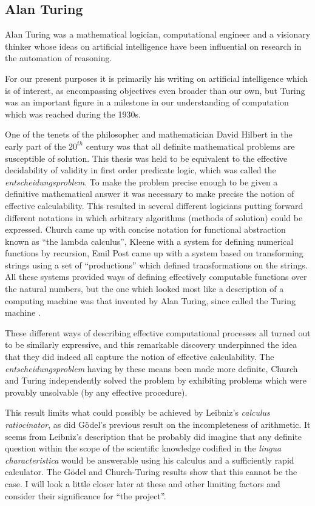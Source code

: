 \subsection{Alan Turing}

Alan Turing was a mathematical logician, computational engineer and a
visionary thinker whose ideas on artificial intelligence have been
influential on research in the automation of reasoning.

For our present purposes it is primarily his writing on artificial
intelligence which is of interest, as encompassing objectives even
broader than our own, but Turing was an important figure in a
milestone in our understanding of computation which was reached during
the 1930s.

One of the tenets of the philosopher and mathematician David Hilbert
in the early part of the $20^{th}$ century was that all definite
mathematical problems are susceptible of solution.
This thesis was held to be equivalent to the effective decidability of
validity in first order predicate logic, which was called the \emph{entscheidungsproblem}.
To make the problem precise enough to be given a definitive
mathematical answer it was necessary to make precise the notion of effective calculability.
This resulted in several different logicians putting forward different
notations in which arbitrary algorithms (methods of solution) could be
expressed.
Church came up with concise notation for functional abstraction known
as ``the lambda calculus'', Kleene with a system for defining
numerical functions by recursion, Emil Post came up with a system
based on transforming strings using a set of ``productions'' which
defined transformations on the strings.
All these systems provided ways of defining effectively computable
functions over the natural numbers, but the one which looked most like
a description of a computing machine was that invented by Alan Turing,
since called the Turing machine \cite{turingOCN}.

These different ways of describing effective computational processes
all turned out to be similarly expressive, and this remarkable
discovery underpinned the idea that they did indeed all capture the
notion of effective calculability.
The \emph{entscheidungsproblem} having by these means been made more
definite, Church and Turing independently solved the problem by
exhibiting problems which were provably unsolvable (by any effective procedure).

This result limits what could possibly be achieved by Leibniz's
\emph{calculus ratiocinator}, as did G\"odel's previous result on the
incompleteness of arithmetic.
It seems from Leibniz's description that he probably did imagine that
any definite question within the scope of the scientific knowledge
codified in the \emph{lingua characteristica} would be answerable
using his calculus and a sufficiently rapid calculator.
The G\"odel and Church-Turing results show that this cannot be the case.
I will look a little closer later at these and other limiting factors
and consider their significance for ``the project''.

